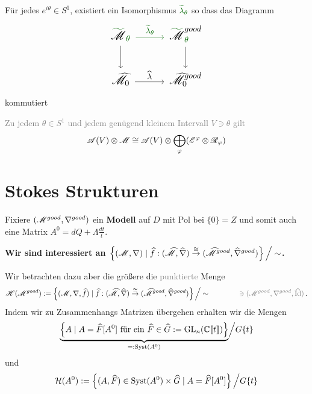\begin{paracol}{2} %
  \begin{thm}
    Für jedes $e^{i\theta}\in S^1$, existiert ein Isomorphismus
    $\textcolor{green!40!black}{\tilde\lambda_\theta}$ so dass das Diagramm
    \[ \Large\begin{tikzcd}
        \textcolor{green!40!black}{\tilde{\textcolor{black}{\sM}}_\theta}
        \dar \rar[green!40!black]{\tilde\lambda_\theta}&
        \textcolor{green!40!black}{%
        \tilde{\textcolor{black}{\sM}}_\theta^{\textcolor{black}{good}}}\dar
        \\\hat\sM_0 \rar{\hat\lambda} &
        \hat\sM_0^{good}
    \end{tikzcd} \]
    kommutiert
  \end{thm}
\switchcolumn %
\begin{thm}
  \textcolor{gray}{%
    Zu jedem $\theta\in S^1$ und jedem genügend kleinem Intervall $V\ni\theta$
    gilt
    \[
      \mathscr{A}(V)\otimes\mathscr{M}\cong\mathscr{A}(V)\otimes\bigoplus_\varphi(\mathscr{E}^\varphi\otimes\mathscr{R}_\varphi)
    \]
  }
\end{thm}
\end{paracol} %
\section{Stokes Strukturen} %
Fixiere $(\mathscr{M}^{good},\nabla^{good})$ ein \textbf{Modell} auf $D$ mit Pol bei
$\{0\}=Z$ und somit auch eine Matrix $A^0=dQ+\Lambda\frac{dt}{t}$.

\begin{center}
  \textbf{Wir sind interessiert an
    $\left\{(\mathscr{M},\nabla)
        \mid \widehat f:(\widehat{\mathscr{M}},\widehat\nabla)
          \overset{\cong}\to
          (\widehat{\mathscr{M}}^{good},\widehat\nabla^{good})
      \right\}\Big/\sim$.}
\end{center}
Wir betrachten dazu aber die größere die \textcolor{gray}{punktierte} Menge 
\[
  \sH(\sM^{good}):=\left\{(\sM,\nabla,\hat f)
      \mid \hat f:(\hat\sM,\hat\nabla)
        \overset{\cong}\to
        (\hat\sM^{good},\hat\nabla^{good})
    \right\}\Big/\sim
    \qquad \qquad
    \textcolor{gray}{\ni (\sM^{good},\nabla^{good},\hat \Id)}\,.
\]
Indem wir zu Zusammenhangs Matrizen übergehen erhalten wir die Mengen
\[
  \underset{=:\Syst(A^0)}{\underbrace{%
      \left\{A \mid A=\hat F[A^0]\text{~für ein~}\hat F\in\hat G
      :=\GL_n(\C\llbracket t\rrbracket)\right\}
  }}\Big/G\{t\}
\]
und
\[
  \mathcal{H}(A^0):=\left\{
      (A,\widehat F)\in\operatorname{Syst}(A^0)\times\widehat G\mid A=\widehat F[A^0]
    \right\}\Big/G\{t\}
\]

